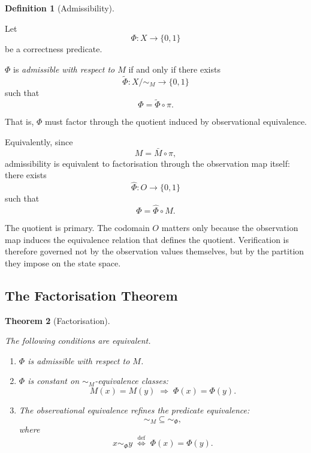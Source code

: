 \documentclass[12pt]{article}
\theoremstyle{plain}
\newtheorem{theorem}{Theorem}[section]
\theoremstyle{definition}
\newtheorem{definition}[theorem]{Definition}
\theoremstyle{remark}
\begin{document}
\begin{definition}[Admissibility]
\label{def:admissibility}

Let
\[
\Phi : X \to \{0,1\}
\]
be a correctness predicate.

$\Phi$ is \emph{admissible with respect to $M$} if and only if there
exists
\[
\widetilde{\Phi} : X/{\sim_M} \to \{0,1\}
\]
such that
\[
\Phi = \widetilde{\Phi} \circ \pi.
\]

That is, $\Phi$ must factor through the quotient induced by
observational equivalence.

Equivalently, since
\[
M = \bar{M} \circ \pi,
\]
admissibility is equivalent to factorisation through the observation
map itself: there exists
\[
\hat{\Phi} : O \to \{0,1\}
\]
such that
\[
\Phi = \hat{\Phi} \circ M.
\]
\end{definition}

The quotient is primary.
The codomain $O$ matters only because the observation map induces the
equivalence relation that defines the quotient.
Verification is therefore governed not by the observation values
themselves, but by the partition they impose on the state space.

\subsection{The Factorisation Theorem}

\begin{theorem}[Factorisation]
\label{thm:factorisation}

The following conditions are equivalent.

\begin{enumerate}[label=(\arabic*),noitemsep]
  \item $\Phi$ is admissible with respect to $M$.

  \item $\Phi$ is constant on $\sim_M$-equivalence classes:
        \[
        M(x) = M(y)
        \;\Rightarrow\;
        \Phi(x) = \Phi(y).
        \]

  \item The observational equivalence refines the predicate
        equivalence:
        \[
        \sim_M \subseteq \sim_{\Phi},
        \]
        where
        \[
        x \sim_{\Phi} y
        \;\stackrel{\mathrm{def}}{\iff}\;
        \Phi(x) = \Phi(y).
        \]
\end{enumerate}
\end{theorem}
\end{document}

